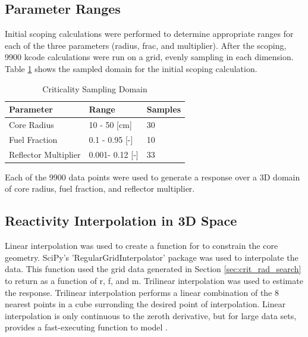 \subsection{Parameter Ranges}
Initial scoping calculations were performed to determine appropriate ranges for
each of the three parameters (radius, frac, and multiplier). After the scoping,
9900 kcode calculations were run on a grid, evenly sampling in each dimension.
Table \ref{tab:bol_criticality_1000} shows the sampled domain for the initial
scoping calculation.

\begin{table}[h]
  \centering
  \caption{Criticality Sampling Domain}
  \begin{tabular}{lll}
    \toprule
     Parameter               & Range          & Samples\\ 
    \midrule                                  
     Core Radius             & 10 - 50 [cm]   & 30 \\
     Fuel Fraction 		     & 0.1 - 0.95 [-] & 10 \\
     Reflector Multiplier    & 0.001- 0.12 [-] & 33 \\
  \end{tabular}
  \label{tab:bol_criticality_1000}
\end{table}

Each of the 9900 data points were used to generate a \keff response over a 3D
domain of core radius, fuel fraction, and reflector multiplier.

\subsection{Reactivity Interpolation in 3D Space}
Linear interpolation was used to create a function for \keff to
constrain the core geometry. SciPy's 'RegularGridInterpolator' package was used
to interpolate the data. This function used the grid data
generated in Section \ref{sec:crit_rad_search} to return \keff as a function of
r, f, and m. Trilinear interpolation was used to estimate the \keff response.
Trilinear interpolation performs a linear combination of the 8 nearest points in
a cube surronding the desired point of interpolation. Linear interpolation is
only continuous to the zeroth derivative, but for large data sets, provides a
fast-executing function to model \keff.

